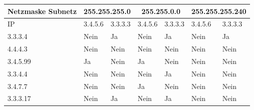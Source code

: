 \begin{myexercise}
\begin{center}
	\end{center}
	\begin{myanswer}
		\begin{table}[H]
			\centering
			\small
			\begin{tabular}{m{2cm}m{1.5cm}m{1.5cm}m{1.5cm}m{1.5cm}m{1.5cm}m{1.7cm}}
				\textbf{Netzmaske Subnetz} & \multicolumn{2}{c}{255.255.255.0} & \multicolumn{2}{c}{255.255.0.0} & \multicolumn{2}{c}{255.255.255.240}                               \\
				\midrule
				\acrshort{IP}              & 3.4.5.6                            & 3.3.3.3                          & 3.4.5.6                             & 3.3.3.3 & 3.4.5.6 & 3.3.3.3 \\
				\midrule
				3.3.3.4                    & Nein                               & Ja                               & Nein                                & Ja      & Nein    & Ja      \\\midrule
				4.4.4.3                    & Nein                               & Nein                             & Nein                                & Nein    & Nein    & Nein    \\\midrule
				3.4.5.99                   & Ja                                 & Nein                             & Ja                                  & Nein    & Nein    & Nein    \\\midrule
				3.3.4.4                    & Nein                               & Nein                             & Nein                                & Ja      & Nein    & Nein    \\\midrule
				3.4.7.7                    & Nein                               & Nein                             & Ja                                  & Nein    & Nein    & Nein    \\\midrule
				3.3.3.17                   & Nein                               & Ja                               & Nein                                & Ja      & Nein    & Nein    \\
			\end{tabular}
		\end{table}
	\end{myanswer}
\end{myexercise}


